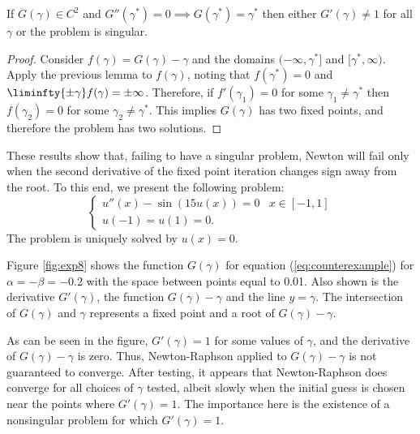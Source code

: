 \documentclass{book}
\begin{document}
\begin{cor}
If $G(\gamma) \in C^2$ and $G''(\gamma^*) = 0 \implies G(\gamma^*) = \gamma^*$ then either $G'(\gamma) \neq 1$ for all $\gamma$ or the problem is singular.
\end{cor}

\begin{proof}
Consider $f(\gamma) = G(\gamma) - \gamma$ and the domains $(-\infty,\gamma^*]$ and $[\gamma^*,\infty)$.
Apply the previous lemma to $f(\gamma)$, noting that $f(\gamma^*) = 0$ and $\liminfty{\pm \gamma} f(\gamma) = \pm \infty$.
Therefore, if $f'(\gamma_1) = 0$ for some $\gamma_1 \neq \gamma^*$ then $f(\gamma_2) = 0$ for some $\gamma_2 \neq \gamma^*$.
This implies $G(\gamma)$ has two fixed points, and therefore the problem has two solutions.
\end{proof}

These results show that, failing to have a singular problem, Newton will fail only when the second derivative of the fixed point iteration changes sign away from the root.
To this end, we present the following problem:
\begin{equation}
\label{eq:counterexample}
\begin{cases} u''(x) - \sin \left ( 15 u(x) \right ) = 0 & x \in [-1,1] \\
u(-1) = u(1) = 0 . \end{cases}
\end{equation}
The problem is uniquely solved by $u(x) = 0$.

Figure \ref{fig:exp8} shows the function $G(\gamma)$ for equation (\ref{eq:counterexample}) for $\alpha = - \beta = -0.2$ with the space between points equal to 0.01.
Also shown is the derivative $G'(\gamma)$, the function $G(\gamma) - \gamma$ and the line $y = \gamma$.
The intersection of $G(\gamma)$ and $\gamma$ represents a fixed point and a root of $G(\gamma) - \gamma$.

As can be seen in the figure, $G'(\gamma) = 1$ for some values of $\gamma$, and the derivative of $G(\gamma) - \gamma$ is zero.
Thus, Newton-Raphson applied to $G(\gamma) - \gamma$ is not guaranteed to converge.
After testing, it appears that Newton-Raphson does converge for all choices of $\gamma$ tested, albeit slowly when the initial guess is chosen near the points where $G'(\gamma) = 1$.
The importance here is the existence of a nonsingular problem for which $G'(\gamma) = 1$.
\end{document}
